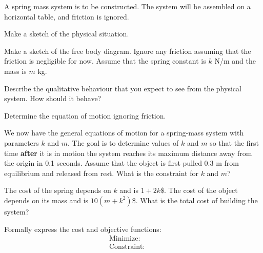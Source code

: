 \begin{problem}
\item A spring mass system is to be constructed. The system will be
  assembled on a horizontal table, and friction is ignored. 
  \begin{subproblem}
    \item Make a sketch of the physical situation.
      \vfill
    \item Make a sketch of the free body diagram. Ignore any friction
      assuming that the friction is negligible for now. Assume that
      the spring constant is $k$ N/m and the mass is $m$ kg.
      \vfill
    \item Describe the qualitative behaviour that you expect to see
      from the physical system. How should it behave?
      \vfill
    \item Determine the equation of motion ignoring friction.
      \vfill
  \end{subproblem}

  \clearpage

\item We now have the general equations of motion for a spring-mass
  system with parameters $k$ and $m$. The goal is to determine values
  of $k$ and $m$ so that the first time \textbf{after} it is in motion
  the system reaches its maximum distance away from the origin in 0.1
  seconds. Assume that the object is first pulled 0.3 m from
  equilibrium and released from rest. What is the constraint for $k$
  and $m$?

  \vfill

\item The cost of the spring depends on $k$ and is $1+2k$\$. The cost of
  the object depends on its mass and is $10(m+k^2)$\$. What is the
  total cost of building the system?

  \vfill

\item Formally express the cost and objective functions:
    \begin{eqnarray*}
      \mathrm{Minimize:} & &  \\
      \mathrm{Constraint:} & & 
    \end{eqnarray*}



\end{problem}


\postClass

